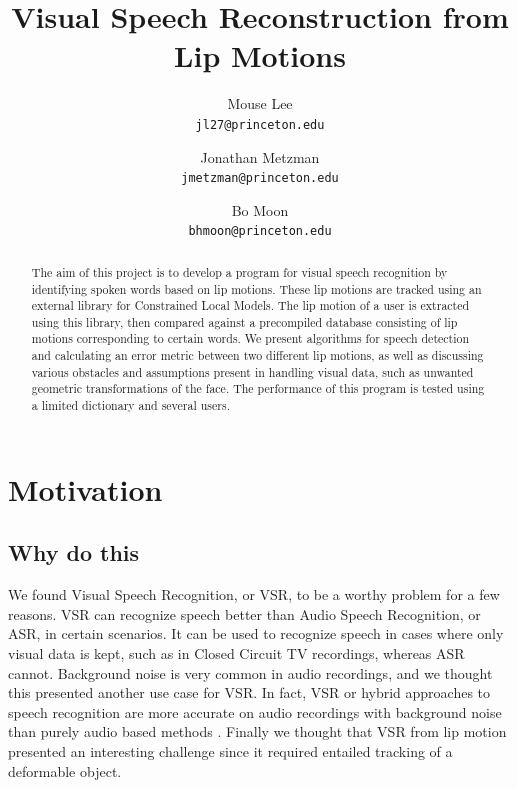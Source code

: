 \documentclass[10pt,twocolumn,letterpaper]{article}
\begin{document}
\title{Visual Speech Reconstruction from Lip Motions}

\author{Mouse Lee\\
{\tt\small jl27@princeton.edu}
\and
Jonathan Metzman\\
{\tt\small jmetzman@princeton.edu}
\and
Bo Moon\\
{\tt\small bhmoon@princeton.edu}
}

\maketitle

\begin{abstract}
  The aim of this project is to develop a program for visual speech recognition by identifying spoken words based on lip motions. These lip motions are tracked using an external library for Constrained Local Models. The lip motion of a user is extracted using this library, then compared against a precompiled database consisting of lip motions corresponding to certain words. We present algorithms for speech detection and calculating an error metric between two different lip motions, as well as discussing various obstacles and assumptions present in handling visual data, such as unwanted geometric transformations of the face. The performance of this program is tested using a limited dictionary and several users.
\end{abstract}

\section{Motivation}
\subsection{Why do this}
We found Visual Speech Recognition, or VSR, to be a worthy problem for a few reasons.
VSR can recognize speech better than Audio Speech Recognition, or ASR, in certain scenarios.
It can be used to recognize speech in cases where only visual data is kept, such as in Closed Circuit TV recordings, whereas ASR cannot.
Background noise is very common in audio recordings, and we thought this presented another use case for VSR.
In fact, VSR or hybrid approaches to speech recognition are more accurate on audio recordings with background noise than purely audio based methods \cite{Dupont}.
Finally we thought that VSR from lip motion presented an interesting challenge since it required entailed tracking of a deformable object.
\end{document}

